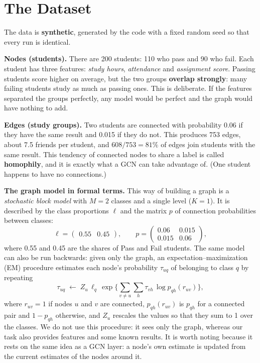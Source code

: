 \documentclass[11pt,a4paper]{article}
\begin{document}
\section{The Dataset}

The data is \textbf{synthetic}, generated by the code with a fixed random seed so that every run is identical.

\textbf{Nodes (students).} There are 200 students: 110 who pass and 90 who fail. Each student has three features: \emph{study hours}, \emph{attendance} and \emph{assignment score}. Passing students score higher on average, but the two groups \textbf{overlap strongly}: many failing students study as much as passing ones. This is deliberate. If the features separated the groups perfectly, any model would be perfect and the graph would have nothing to add.

\textbf{Edges (study groups).} Two students are connected with probability 0.06 if they have the same result and 0.015 if they do not. This produces 753 edges, about 7.5 friends per student, and $608/753 = 81\%$ of edges join students with the same result. This tendency of connected nodes to share a label is called \textbf{homophily}, and it is exactly what a GCN can take advantage of. (One student happens to have no connections.)

\textbf{The graph model in formal terms.} This way of building a graph is a \emph{stochastic block model} with $M = 2$ classes and a single level ($K = 1$). It is described by the class proportions $\ell$ and the matrix $p$ of connection probabilities between classes:
\begin{equation}
  \ell = \begin{pmatrix} 0.55 & 0.45 \end{pmatrix},
  \qquad
  p = \begin{pmatrix} 0.06 & 0.015 \\ 0.015 & 0.06 \end{pmatrix},
\end{equation}
where 0.55 and 0.45 are the shares of Pass and Fail students. The same model can also be run backwards: given only the graph, an expectation--maximization (EM) procedure estimates each node's probability $\tau_{uq}$ of belonging to class $q$ by repeating
\begin{equation}
  \tau_{uq} \;\leftarrow\; Z_u \, \ell_q \, \exp\Big\{ \sum_{v \neq u} \sum_{h} \tau_{vh} \, \log p_{qh}(r_{uv}) \Big\},
  \label{eq:em}
\end{equation}
where $r_{uv} = 1$ if nodes $u$ and $v$ are connected, $p_{qh}(r_{uv})$ is $p_{qh}$ for a connected pair and $1 - p_{qh}$ otherwise, and $Z_u$ rescales the values so that they sum to 1 over the classes. We do not use this procedure: it sees only the graph, whereas our task also provides features and some known results. It is worth noting because it rests on the same idea as a GCN layer: a node's own estimate is updated from the current estimates of the nodes around it.
\end{document}
